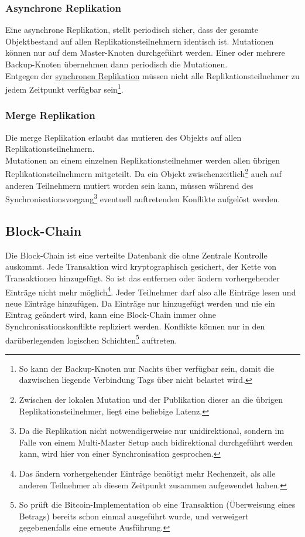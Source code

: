 \documentclass[oneside,11pt,parskip=half,ngerman]{scrreprt}
\begin{document}
\subsubsection{Asynchrone Replikation}\label{asynchrone-replikation}

Eine asynchrone Replikation, stellt periodisch sicher, dass der gesamte
Objektbestand auf allen Replikationsteilnehmern identisch ist.
Mutationen können nur auf dem Master-Knoten durchgeführt werden. Einer
oder mehrere Backup-Knoten übernehmen dann periodisch die
Mutationen.\\Entgegen der \hyperref[synchrone-replikation]{synchronen
Replikation} müssen nicht alle Replikationsteilnehmer zu jedem Zeitpunkt
verfügbar sein\footnote{So kann der Backup-Knoten nur Nachts über
  verfügbar sein, damit die dazwischen liegende Verbindung Tags über
  nicht belastet wird.}.

\subsubsection{Merge Replikation}\label{merge-replikation}

Die merge Replikation erlaubt das mutieren des Objekts auf allen
Replikationsteilnehmern.\\Mutationen an einem einzelnen
Replikationsteilnehmer werden allen übrigen Replikationsteilnehmern
mitgeteilt. Da ein Objekt zwischenzeitlich\footnote{Zwischen der lokalen
  Mutation und der Publikation dieser an die übrigen
  Replikationsteilnehmer, liegt eine beliebige Latenz.} auch auf anderen
Teilnehmern mutiert worden sein kann, müssen während des
Synchronisationsvorgang\footnote{Da die Replikation nicht
  notwendigerweise nur unidirektional, sondern im Falle von einem
  Multi-Master Setup auch bidirektional durchgeführt werden kann, wird
  hier von einer Synchronisation gesprochen.} eventuell auftretenden
Konflikte aufgelöst werden.

\subsection{Block-Chain}\label{block-chain}

Die Block-Chain ist eine verteilte Datenbank die ohne Zentrale Kontrolle
auskommt. Jede Transaktion wird kryptographisch gesichert, der Kette von
Transaktionen hinzugefügt. So ist das entfernen oder ändern
vorhergehender Einträge nicht mehr möglich\footnote{Das ändern
  vorhergehender Einträge benötigt mehr Rechenzeit, als alle anderen
  Teilnehmer ab diesem Zeitpunkt zusammen aufgewendet haben.}. Jeder
Teilnehmer darf also alle Einträge lesen und neue Einträge hinzufügen.
Da Einträge nur hinzugefügt werden und nie ein Eintrag geändert wird,
kann eine Block-Chain immer ohne Synchronisationskonflikte repliziert
werden. Konflikte können nur in den darüberlegenden logischen
Schichten\footnote{So prüft die Bitcoin-Implementation ob eine
  Transaktion (Überweisung eines Betrags) bereits schon einmal
  ausgeführt wurde, und verweigert gegebenenfalls eine erneute
  Ausführung.} auftreten. \autocite{block-chain}
\end{document}
